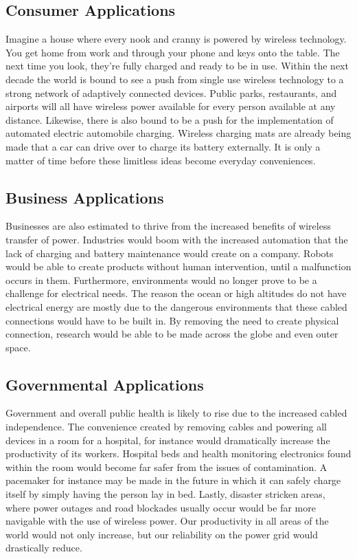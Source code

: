 \documentclass{article}
\begin{document}
\subsection{Consumer Applications}
Imagine a house where every nook and cranny is powered by wireless technology. You get home from work and through your phone and keys onto the table. The next time you look, they're fully charged and ready to be in use. Within the next decade the world is bound to see a push from single use wireless technology to a strong network of adaptively connected devices. Public parks, restaurants, and airports will all have wireless power available for every person available at any distance. Likewise, there is also bound to be a push for the implementation of automated electric automobile charging. Wireless charging mats are already being made that a car can drive over to charge its battery externally. It is only a matter of time before these limitless ideas become everyday conveniences.

\subsection{Business Applications}
Businesses are also estimated to thrive from the increased benefits of wireless transfer of power. Industries would boom with the increased automation that the lack of charging and battery maintenance would create on a company. Robots would be able to create products without human intervention, until a malfunction occurs in them. Furthermore, environments would no longer prove to be a challenge for electrical needs. The reason the ocean or high altitudes do not have electrical energy are mostly due to the dangerous environments that these cabled connections would have to be built in. By removing the need to create physical connection, research would be able to be made across the globe and even outer space.

\subsection{Governmental Applications}
Government and overall public health is likely to rise due to the increased cabled independence. The convenience created by removing cables and powering all devices in a room for a hospital, for instance would dramatically increase the productivity of its workers. Hospital beds and health monitoring electronics found within the room would become far safer from the issues of contamination. A pacemaker for instance may be made in the future in which it can safely charge itself by simply having the person lay in bed. Lastly, disaster stricken areas, where power outages and road blockades usually occur would be far more navigable with the use of wireless power. Our productivity in all areas of the world would not only increase, but our reliability on the power grid would drastically reduce. 
\end{document}
